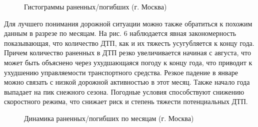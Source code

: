 \documentclass[a4paper, 14pt]{article}
\begin{document}
\begin{figure}[h]
	\caption{Гистограммы раненных/погибших (г. Москва)}
\end{figure}

Для лучшего понимания дорожной ситуации можно также обратиться к похожим данным в разрезе по месяцам. На рис. 6 наблюдается явная закономерность показывающая, что количество ДТП, как и их тяжесть усугубляется к концу года. Причем количество раненных в ДТП резко увеличивается начиная с августа, что может быть объяснено через ухудшающаяся погоду к концу года, что приводит к ухудшению управляемости транспортного средства. Резкое падение в январе можно связать с низкой дорожной активностью в этот месяц. Также начало года выпадает на пик снежного сезона. Погодные условия способствуют снижению скоростного режима, что снижает риск и степень тяжести потенциальных ДТП.

\begin{figure}[h]
	\caption{Динамика раненных/погибших по месяцам (г. Москва)}
\end{figure}
\end{document}
